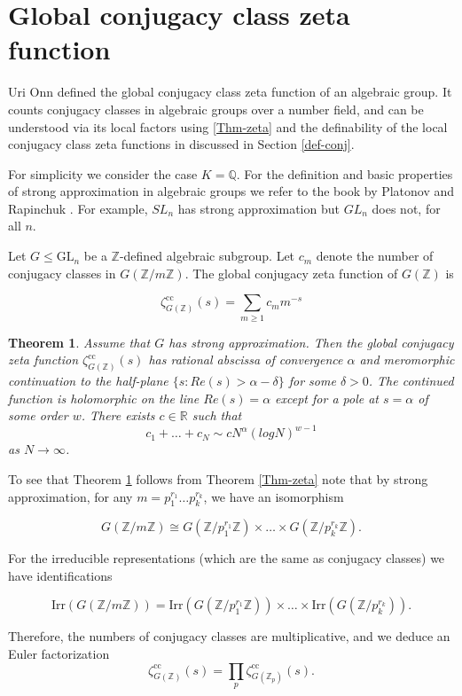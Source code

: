 \documentclass[12pt]{amsart}
\def\R{\mathbb{R}}
\def\GL{\mathrm{GL}}
\def\Z{\mathbb{Z}}
\def\R{\mathbb{R}}
\def\Q{\mathbb{Q}}
\newtheorem{thm}{Theorem}[section]
\numberwithin{equation}{section}
\begin{document}
\section{\bf Global conjugacy class zeta function}\label{global-conj}

Uri Onn defined the global conjugacy class zeta function of an algebraic group. It counts conjugacy classes in algebraic groups over a number field, and can be understood via its local factors using \ref{Thm-zeta} and the definability of the local conjugacy class zeta functions in \cite{BDOP} discussed in Section \ref{def-conj}.

For simplicity we consider the case $K=\Q$.
For the definition and basic properties of strong approximation in algebraic groups we refer to the book by Platonov and Rapinchuk \cite[Chapter 7.1]{Platonov-R-book}. For example, $SL_n$ has strong approximation but $GL_n$ does not, for all $n$. 

Let $G \le \GL_n$ be a
$\Z$-defined algebraic subgroup. Let $c_m$ denote 
the number of conjugacy classes in $G(\Z/m\Z)$.
The global conjugacy zeta function of $G(\Z)$ is

$$\zeta_{G(\Z)}^{\mathrm{cc}}(s)=\sum_{m\geq 1}
c_{m} m^{-s}$$


\begin{thm}\label{glob-conj} \cite{zeta1} Assume that $G$ has strong approximation. 
Then the global conjugacy zeta function $\zeta_{G(\Z)}^{\mathrm{cc}}(s)$ has rational abscissa of convergence $\alpha$ and meromorphic continuation to the half-plane
$\{s: Re(s)>\alpha-\delta\}$ for some $\delta >0$. The continued function is holomorphic on the line $Re(s)=\alpha$ except for a pole at $s=\alpha$ of some order $w$. 
There exists $c\in \R$ such that 
$$c_1+\dots+c_N \sim cN^{\alpha} (log N)^{w-1}$$
as $N\rightarrow \infty$.\end{thm}


To see that Theorem \ref{glob-conj} follows from Theorem \ref{Thm-zeta} note that by strong approximation, for any $m=p_1^{r_1}\dots p_k^{r_k}$, we have an isomorphism

$$G(\Z/m\Z) \cong G(\Z/p_1^{r_1}\Z) \times \dots
\times G(\Z/p_k^{r_k}\Z).$$

For the irreducible representations (which are the same as conjugacy classes) we have identifications

$$\mathrm{Irr}(G(\Z/m\Z)) =
\mathrm{Irr}(G(\Z/p_1^{r_1}\Z))\times \dots
\times \mathrm{Irr}(G(\Z/p_k^{r_k})).$$

Therefore, the numbers of conjugacy classes are multiplicative, and we deduce an Euler factorization 
$$\zeta_{G(\Z)}^{\mathrm{cc}}(s)=\prod_{p}\zeta_{G(\Z_p)}^{\mathrm{cc}}(s).$$
\end{document}
